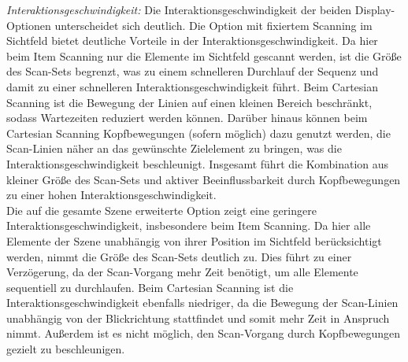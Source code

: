 \textit{Interaktionsgeschwindigkeit:}
Die Interaktionsgeschwindigkeit der beiden Display-Optionen unterscheidet sich deutlich. Die Option mit fixiertem Scanning im Sichtfeld bietet deutliche Vorteile in der Interaktionsgeschwindigkeit. Da hier beim Item Scanning nur die Elemente im Sichtfeld gescannt werden, ist die Größe des Scan-Sets begrenzt, was zu einem schnelleren Durchlauf der Sequenz und damit zu einer schnelleren Interaktionsgeschwindigkeit führt. Beim Cartesian Scanning ist die Bewegung der Linien auf einen kleinen Bereich beschränkt, sodass Wartezeiten reduziert werden können. Darüber hinaus können beim Cartesian Scanning Kopfbewegungen (sofern möglich) dazu genutzt werden, die Scan-Linien näher an das gewünschte Zielelement zu bringen, was die Interaktionsgeschwindigkeit beschleunigt. Insgesamt führt die Kombination aus kleiner Größe des Scan-Sets und aktiver Beeinflussbarkeit durch Kopfbewegungen zu einer hohen Interaktionsgeschwindigkeit.\\
Die auf die gesamte Szene erweiterte Option zeigt eine geringere Interaktionsgeschwindigkeit, insbesondere beim Item Scanning. Da hier alle Elemente der Szene unabhängig von ihrer Position im Sichtfeld berücksichtigt werden, nimmt die Größe des Scan-Sets deutlich zu. Dies führt zu einer Verzögerung, da der Scan-Vorgang mehr Zeit benötigt, um alle Elemente sequentiell zu durchlaufen. Beim Cartesian Scanning ist die Interaktionsgeschwindigkeit ebenfalls niedriger, da die Bewegung der Scan-Linien unabhängig von der Blickrichtung stattfindet und somit mehr Zeit in Anspruch nimmt. Außerdem ist es nicht möglich, den Scan-Vorgang durch Kopfbewegungen gezielt zu beschleunigen. 


